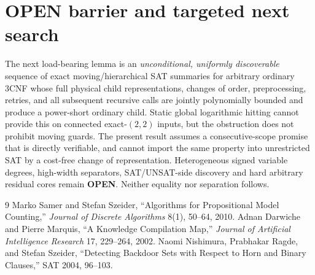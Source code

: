 \documentclass[11pt]{article}
\begin{document}
\section{OPEN barrier and targeted next search}
The next load-bearing lemma is an \emph{unconditional, uniformly discoverable} sequence of exact moving/hierarchical SAT summaries for arbitrary ordinary 3CNF whose full physical child representations, changes of order, preprocessing, retries, and all subsequent recursive calls are jointly polynomially bounded and produce a power-short ordinary child. Static global logarithmic hitting cannot provide this on connected exact-$(2,2)$ inputs, but the obstruction does not prohibit moving guards. The present result assumes a consecutive-scope promise that is directly verifiable, and cannot import the same property into unrestricted SAT by a cost-free change of representation. Heterogeneous signed variable degrees, high-width separators, SAT/UNSAT-side discovery and hard arbitrary residual cores remain \textbf{OPEN}. Neither equality nor separation follows.

\begin{thebibliography}{9}
 Marko Samer and Stefan Szeider, ``Algorithms for Propositional Model Counting,'' \emph{Journal of Discrete Algorithms} 8(1), 50--64, 2010.
 Adnan Darwiche and Pierre Marquis, ``A Knowledge Compilation Map,'' \emph{Journal of Artificial Intelligence Research} 17, 229--264, 2002.
 Naomi Nishimura, Prabhakar Ragde, and Stefan Szeider, ``Detecting Backdoor Sets with Respect to Horn and Binary Clauses,'' SAT 2004, 96--103.
\end{thebibliography}
\end{document}
